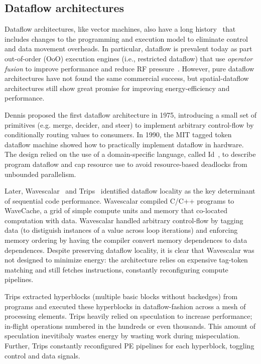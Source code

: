 \subsection{Dataflow architectures}
Dataflow architectures, like vector machines, also have a long history~\cite{dennis1975preliminary,dennis1980data,dennis1988efficient,ttda} that includes changes to the programming and execution model to eliminate control and data movement overheads.
% 
% 
In particular, dataflow is prevalent today as part out-of-order (OoO) execution engines (i.e., restricted
dataflow) that use \emph{operator fusion} to improve performance and reduce RF
pressure~\cite{bracy2004dataflow,sassone2004dynamic,kim2002instruction,sembrant2015long,acsiliouglu2015lazy}.
% 
However, pure dataflow architectures have not found the same commercial success, but spatial-dataflow architectures still show great promise for improving energy-efficiency and performance.

Dennis proposed the first dataflow architecture in 1975, introducing a small set of primitives (e.g. merge, decider, and steer) to implement arbitrary control-flow by conditionally routing values to consumers.
% 
In 1990, the MIT tagged token dataflow machine showed how to practically implement dataflow in hardware.
% 
The design relied on the use of a domain-specific language, called Id~\cite{id-compiler}, to describe program dataflow and cap resource use to avoid resource-based deadlocks from unbounded parallelism.

Later, Wavescalar~\cite{swanson2003wavescalar} and Trips~\cite{trips} identified dataflow locality as the key determinant of sequential code performance.
% 
Wavescalar compiled C/C++ programs to WaveCache, a grid of simple compute units and memory that co-located computation with data.
% 
Wavescalar handled arbitrary control-flow by tagging data (to distiguish instances of a value across loop iterations) and enforcing memory ordering by having the compiler convert memory dependences to data dependences.
% 
Despite preserving dataflow locality, it is clear that Wavescalar was not designed to minimize energy: the architecture relies on expensive tag-token matching and still fetches instructions, constantly reconfiguring compute pipelines.

Trips extracted hyperblocks (multiple basic blocks without backedges) from programs and executed these hyperblocks in dataflow-fashion across a mesh of processing elements.
% 
Trips heavily relied on speculation to increase performance; in-flight operations numbered in the hundreds or even thousands.
% 
This amount of speculation inevitibaly wastes energy by wasting work during mispeculation.
% 
Further, Trips constantly reconfigured PE pipelines for each hyperblock, toggling control and data signals.

